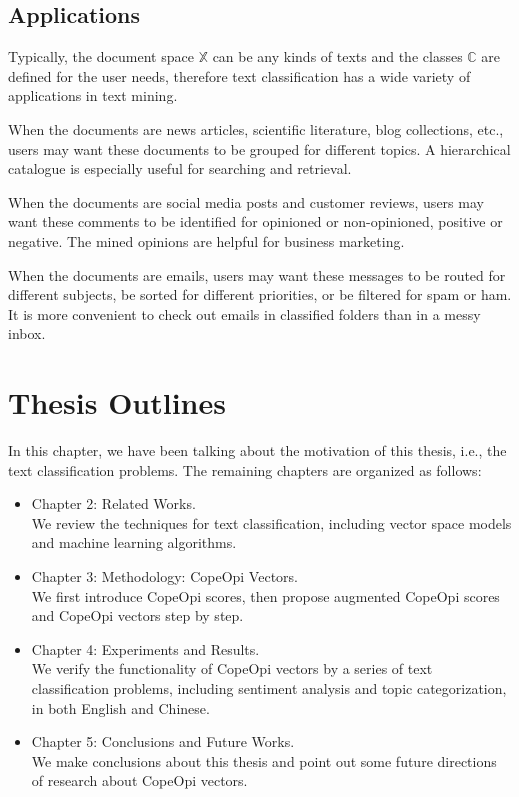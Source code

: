 \subsection{Applications}
Typically, the document space $\mathbb{X}$ can be any kinds of texts and the classes $\mathbb{C}$ are defined for the user needs, therefore text classification has a wide variety of applications in text mining\cite{aggarwal2012tc}.
~\newline
~\newline
{}
\par When the documents are news articles, scientific literature, blog collections, etc., users may want these documents to be grouped for different topics. A hierarchical catalogue is especially useful for searching and retrieval.
~\newline
~\newline
{}
\par When the documents are social media posts and customer reviews, users may want these comments to be identified for opinioned or non-opinioned, positive or negative. The mined opinions are helpful for business marketing.
~\newline
~\newline
{}
\par When the documents are emails, users may want these messages to be routed for different subjects, be sorted for different priorities, or be filtered for spam or ham. It is more convenient to check out emails in classified folders than in a messy inbox.


\section{Thesis Outlines}
In this chapter, we have been talking about the motivation of this thesis, i.e., the text classification problems. The remaining chapters are organized as follows:
\begin{itemize}
\item Chapter 2: Related Works.\\
We review the techniques for text classification, including vector space models and machine learning algorithms.
\item Chapter 3: Methodology: CopeOpi Vectors.\\
We first introduce CopeOpi scores, then propose augmented CopeOpi scores and CopeOpi vectors step by step.
\item Chapter 4: Experiments and Results.\\
We verify the functionality of CopeOpi vectors by a series of text classification problems, including sentiment analysis and topic categorization, in both English and Chinese.
\item Chapter 5: Conclusions and Future Works.\\
We make conclusions about this thesis and point out some future directions of research about CopeOpi vectors.
\end{itemize}